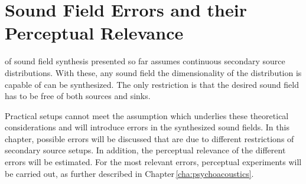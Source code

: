 \def \GITHUB {\GITHUBBASE/03_sound_field_errors_and_their_perceptual_relevance}


\chapter{Sound Field Errors and their Perceptual Relevance}
\label{cha:sound_field_errors_and_their_perceptual_relevance}
%
 of sound field synthesis presented so far assumes
continuous secondary source
distributions. With these, any sound field the dimensionality of the
distribution is capable of can be synthesized. The only restriction is that the desired sound
field has to be free of both sources and sinks.

Practical setups cannot meet the assumption which underlies these theoretical
considerations and will introduce errors in the synthesized sound fields.
In this chapter, possible errors will be discussed that are due to
different restrictions of secondary
source setups. In addition, the perceptual relevance of the
different errors will be estimated. For the most relevant errors, perceptual
experiments will be carried out, as further described in Chapter\,\ref{cha:psychoacoustics}.


